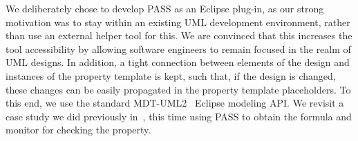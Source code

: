 \documentclass[letter]{llncs}
\begin{document}
\vspace{-3 pt}
We deliberately chose to develop PASS as an Eclipse plug-in, as
our strong motivation was to stay within an existing UML development
environment, rather than use an external helper tool for this.  We are
convinced that this increases the tool accessibility by allowing software
engineers to remain focused in the realm of UML designs.  In addition,
a tight connection between elements of the design and instances of the property
template is kept, such that, if the design is changed, these changes can
be easily propagated in the property template placeholders.  To this end,
we use the standard MDT-UML2~\cite{MDTUML2} Eclipse modeling API.
We revisit a case study we did previously
in~\cite{DBLP:dblp_conf/nfm/RemenskaTWHVCB13}, this time using PASS
to obtain the formula and monitor for checking the
property.\medskip
\vspace{-3 pt}
\end{document}
